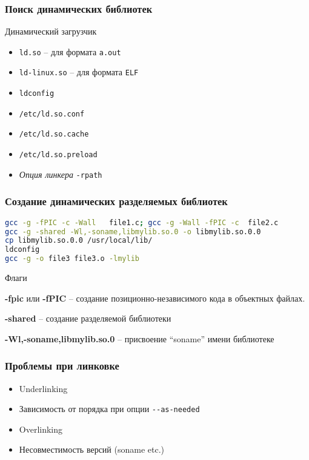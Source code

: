 \begin{frame}[fragile]
  \frametitle{Поиск динамических библиотек}
  \begin{block}{Динамический загрузчик}
     \begin{itemize}
	\item {\tt ld.so} -- для формата {\tt a.out}
	\item {\tt ld-linux.so} -- для формата {\tt ELF}
    \end{itemize}
  \end{block}
  \begin{itemize}
	\item {\tt ldconfig}
	\item {\tt /etc/ld.so.conf}
	\item {\tt /etc/ld.so.cache}
	\item {\tt /etc/ld.so.preload}
	\item {\it Опция линкера} {\tt -rpath}
  \end{itemize}
\end{frame}


\begin{frame}[fragile]
  \frametitle{Создание динамических разделяемых библиотек}
\begin{lstlisting}[language=sh]
gcc -g -fPIC -c -Wall   file1.c; gcc -g -Wall -fPIC -c  file2.c
gcc -g -shared -Wl,-soname,libmylib.so.0 -o libmylib.so.0.0 
cp libmylib.so.0.0 /usr/local/lib/
ldconfig 
gcc -g -o file3 file3.o -lmylib
\end{lstlisting}

	\begin{block}{Флаги}
	
		{\bf -fpic} или {\bf -fPIC} -- создание позиционно-независимого кода в объектных файлах.

		{\bf -shared} -- создание разделяемой библиотеки

		{\bf -Wl,-soname,libmylib.so.0} -- присвоение ``soname'' имени библиотеке

	\end{block}

\end{frame}

\begin{frame}
 \frametitle{Проблемы при линковке}
 \begin{itemize}
   \item Underlinking
   \item Зависимость от порядка при опции {\tt -{}-as-needed} 
   \item Overlinking
   \item Несовместимость версий (soname etc.)
 \end{itemize}
\end{frame}

